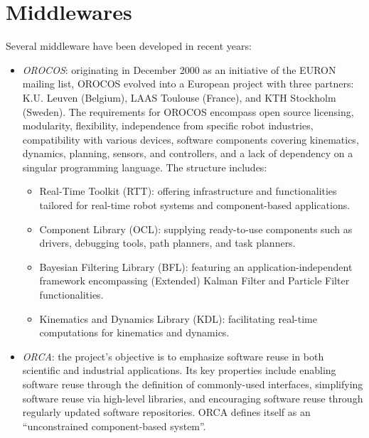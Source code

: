 \section{Middlewares}

Several middleware have been developed in recent years:
\begin{itemize}
    \item \textit{OROCOS}: originating in December 2000 as an initiative of the EURON mailing list, OROCOS evolved into a European project with three partners: K.U. Leuven (Belgium), LAAS Toulouse (France), and KTH Stockholm (Sweden).
        The requirements for OROCOS encompass open source licensing, modularity, flexibility, independence from specific robot industries, compatibility with various devices, software components covering kinematics, dynamics, planning, sensors, and controllers, and a lack of dependency on a singular programming language.
        The structure includes:
        \begin{itemize}
            \item Real-Time Toolkit (RTT): offering infrastructure and functionalities tailored for real-time robot systems and component-based applications.
            \item Component Library (OCL): supplying ready-to-use components such as drivers, debugging tools, path planners, and task planners.
            \item Bayesian Filtering Library (BFL): featuring an application-independent framework encompassing (Extended) Kalman Filter and Particle Filter functionalities.
            \item Kinematics and Dynamics Library (KDL): facilitating real-time computations for kinematics and dynamics.
        \end{itemize}
    \item \textit{ORCA}: the project's objective is to emphasize software reuse in both scientific and industrial applications. 
        Its key properties include enabling software reuse through the definition of commonly-used interfaces, simplifying software reuse via high-level libraries, and encouraging software reuse through regularly updated software repositories. 
        ORCA defines itself as an ``unconstrained component-based system''.
        

\end{itemize}
